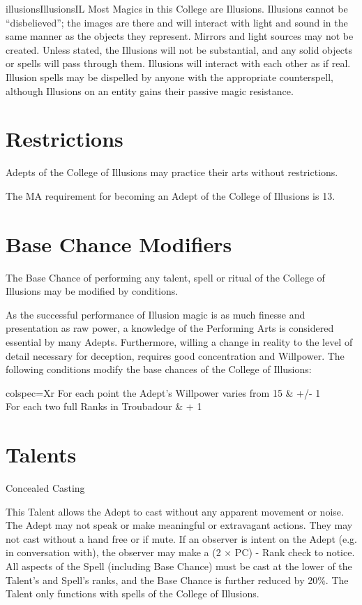 \begin{College}[1.5]{illusions}{Illusions}{IL}
Most Magics in this College are Illusions. Illusions cannot be
“disbelieved”; the images are there and will interact with light and
sound in the same manner as the objects they represent. Mirrors and
light sources may not be created.  Unless stated, the Illusions will
not be substantial, and any solid objects or spells will pass through
them.  Illusions will interact with each other as if real.  Illusion
spells may be dispelled by anyone with the appropriate counterspell,
although Illusions on an entity gains their passive magic resistance.

\section{Restrictions}

Adepts of the College of Illusions may practice their arts without
restrictions.

The MA requirement for becoming an Adept of the College of Illusions
is 13.

\section{Base Chance Modifiers}

The Base Chance of performing any talent, spell or ritual of the
College of Illusions may be modified by conditions.

As the successful performance of Illusion magic is as much finesse and
presentation as raw power, a knowledge of the Performing Arts is
considered essential by many Adepts.  Furthermore, willing a change in
reality to the level of detail necessary for deception, requires good
concentration and Willpower.  The following conditions modify the
base chances of the College of Illusions:

\begin{dqtblr}{colspec={Xr}}
For each point the Adept’s Willpower varies from 15	&  +/- 1 \\
For each two full Ranks in Troubadour			& + 1 \\
\end{dqtblr}

\section{Talents}

\begin{talent}[T-1]{Concealed Casting}

\begin{effects}
This Talent allows the Adept to cast without any apparent movement or
noise.  The Adept may not speak or make meaningful or extravagant
actions. They may not cast without a hand free or if mute.  If an
observer is intent on the Adept (e.g. in conversation with), the
observer may make a (2 × PC) - Rank check to notice. All aspects of
the Spell (including Base Chance) must be cast at the lower of the
Talent’s and Spell’s ranks, and the Base Chance is further reduced by
20\%. The Talent only functions with spells of the College of
Illusions.
\end{effects}
\end{talent}


\end{College}
